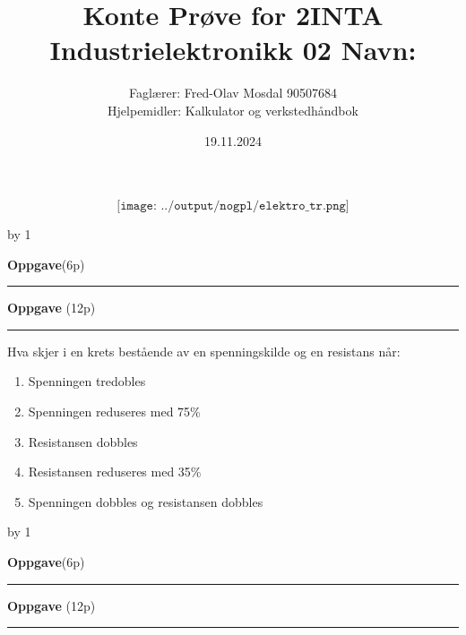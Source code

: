 \documentclass[12pt,a4paper]{article}
\def\oppgave{
            \advance\questnum by 1
	    \ifthenelse{\questnum>0\AND \questnum<9}
	    {
                \vskip 1cm
		\textbf{Oppgave}\hskip 5pt\the\questnum \hfill \hfill(6p)
		\vskip 3pt
		\hrule
	\vskip 0.5cm}
	{
                \vskip 1cm
		\textbf{Oppgave}\hskip 5pt \the\questnum \hfill \hfill(12p)
		\vskip 3pt \hrule \vskip 0.5cm }

		}
\begin{document}
\title{Konte Prøve for 2INTA\\ Industrielektronikk 02\vskip 1cm Navn:\leaders\vrule height 0pt depth 1pt \hfill \null}
\author{Faglærer: Fred-Olav Mosdal 90507684\\Hjelpemidler: Kalkulator og verkstedhåndbok}
\date{19.11.2024}
\maketitle
	$$\texttt{[image: ../output/nogpl/elektro\_tr.png]}$$

\newpage
\oppgave{}%
\vskip 2.5pt 
Hva skjer i en krets bestående av en spenningskilde og en resistans når:

\begin{enumerate}
\item Spenningen tredobles
\vskip 5pt 
\vskip 2.5pt 
\item Spenningen reduseres med 75\%
\vskip 5pt 
\vskip 2.5pt 
\item Resistansen dobbles
\vskip 5pt 
\vskip 2.5pt 
\item Resistansen reduseres med 35\%
\vskip 5pt 
\vskip 2.5pt 
\item Spenningen dobbles og resistansen dobbles
\end{enumerate}

\oppgave{}%
\vskip 2.5pt 
\end{document}
